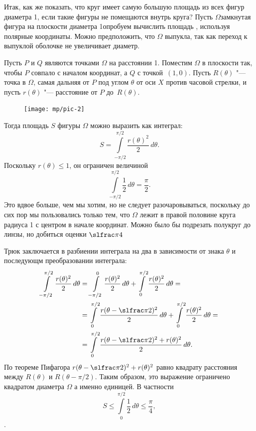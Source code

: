 \documentclass[twoside]{book}
\begin{document}
Итак, как же показать, что круг имеет самую большую площадь из всех фигур диаметра 1, если такие фигуры не помещаются внутрь круга?
Пусть $\Omega$замкнутая фигура на плоскости диаметра 1опробуем вычислить площадь , используя полярные координаты.
Можно предположить, что  $\Omega$ выпукла, так как переход к выпуклой оболочке не увеличивает диаметр.

Пусть $P$ и $Q$ являются точками  $\Omega$ на расстоянии 1.
Поместим $\Omega$ в плоскости так, чтобы $P$ совпало с началом координат, а $Q$ с точкой~$(1,0)$.
Пусть $R(\theta)$ "--- точка в $\Omega$, самая дальняя от $P$ под углом $\theta$ от оси $X$ против часовой стрелки, и пусть $r(\theta)$ "--- расстояние от $P$ до~$R(\theta)$.


\begin{figure}
\vskip4mm
\centering
\texttt{[image: mp/pic-2]}
\end{figure}

Тогда площадь $S$ фигуры $\Omega$ можно выразить как интеграл:
\[S=\int\limits_{-\pi/2}^{\pi/2}\frac{r(\theta)^2}{2}\,d\theta.\]
Поскольку $r(\theta) \le 1$, он ограничен величиной
\[\int\limits_{-\pi/2}^{\pi/2}\frac{1}{2}\,d\theta=\frac\pi2.\]
Это вдвое больше, чем мы хотим, но не следует разочаровываться, поскольку до сих пор мы пользовались только тем, что $\Omega$ лежит в правой половине круга радиуса 1 с центром в начале координат.
Можно было бы подрезать полукруг до линзы, но  добиться оценки $\slfrac\pi4$

Трюк заключается в разбиении интеграла на два в зависимости от знака $\theta$ и последующм преобразовании интеграла:
\begin{align*}
\int\limits_{-\pi/2}^{\pi/2}\frac{r(\theta)^2}{2}\,d\theta&=\int\limits_{-\pi/2}^{0}\frac{r(\theta)^2}{2}\,d\theta+\int\limits_{0}^{\pi/2}\frac{r(\theta)^2}{2}\,d\theta=
\\
&=\int\limits_{0}^{\pi/2}\frac{r(\theta-\slfrac\pi2)^2}{2}\,d\theta+\int\limits_{0}^{\pi/2}\frac{r(\theta)^2}{2}\,d\theta=
\\
&=\int\limits_{0}^{\pi/2}\frac{r(\theta-\slfrac\pi2)^2+r(\theta)^2}{2}\,d\theta.
\end{align*}
По теореме Пифагора $r(\theta-\slfrac\pi2)^2+r(\theta)^2$ равно квадрату расстояния между $R(\theta)$ и $R(\theta- \pi/2)$.
Таким образом, это выражение ограничено квадратом диаметра $\Omega$ а именно единицей.
В частности
\[S\le \int\limits_{0}^{\pi/2}\frac12\,d\theta\le\frac\pi4,
\]
.
\heart
\end{document}
